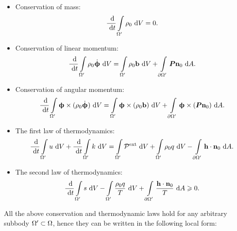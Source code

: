 \begin{itemize}
  \item Conservation of mass:
        \begin{align}
          \dfrac{\text{ d}}{\text{ d}t} \int\limits_{\Omega'} \rho_0 \text{ d}V = 0.
        \end{align}
  \item Conservation of linear momentum:
        \begin{align}
          \dfrac{\text{ d}}{\text{ d}t} \int\limits_{\Omega'} \rho_0 \dot{\boldsymbol{\upphi}} \text{ d}V = \int\limits_{\Omega'} \rho_0 \textbf{b} \text{ d}V + \int\limits_{{\partial \Omega}'} \boldsymbol{P}\textbf{n}_0 \text{ d}A.
        \end{align}
  \item Conservation of angular momentum:
        \begin{align}
          \dfrac{\text{ d}}{\text{ d}t} \int\limits_{\Omega'} \boldsymbol{\upphi} \times (\rho_0 \dot{\boldsymbol{\upphi}}) \text{ d}V = \int\limits_{\Omega'} \boldsymbol{\upphi} \times (\rho_0 \textbf{b}) \text{ d}V + \int\limits_{{\partial \Omega}'} \boldsymbol{\upphi} \times (\boldsymbol{P}\textbf{n}_0) \text{ d}A.
        \end{align}
  \item The first law of thermodynamics:
        \begin{equation}
          \begin{aligned}
            \dfrac{\text{ d}}{\text{ d}t} \int\limits_{\Omega'} u \text{ d}V + \dfrac{\text{ d}}{\text{ d}t} \int\limits_{\Omega'} k \text{ d}V = \int\limits_{\Omega'} \mathcal{P}^\text{ext} \text{ d}V + \int\limits_{\Omega'} \rho_0 q \text{ d}V - \int\limits_{{\partial \Omega}'} \textbf{h} \cdot \textbf{n}_0 \text{ d}A.
          \end{aligned}
        \end{equation}
  \item The second law of thermodynamics:
        \begin{align}
          \dfrac{\text{ d}}{\text{ d}t} \int\limits_{\Omega'} s \text{ d}V - \int\limits_{\Omega'} \dfrac{\rho_0 q}{T} \text{ d}V + \int\limits_{{\partial \Omega}'} \dfrac{\textbf{h} \cdot \textbf{n}_0}{T} \text{ d}A \geqslant 0.
        \end{align}
\end{itemize}
All the above conservation and thermodynamic laws hold for any arbitrary subbody $\Omega' \subset \Omega$, hence they can be written in the following local form:
